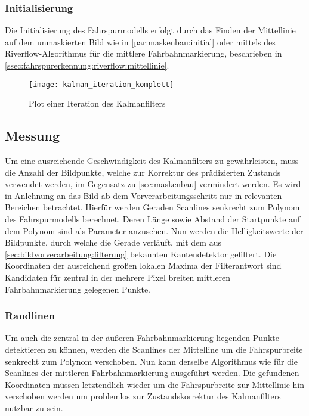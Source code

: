 \subsubsection{Initialisierung} 
\label{sssec:fahrspurerkennung:kalman:fahrspurmodell:initialisierung}
 Die Initialisierung des Fahrspurmodells erfolgt durch das Finden der Mittellinie auf dem unmaskierten Bild wie in \ref{par:maskenbau:initial} oder mittels des Riverflow-Algorithmus für die mittlere Fahrbahnmarkierung, beschrieben in \ref{ssec:fahrspurerkennung:riverflow:mittellinie}.
 
 \begin{figure}[htb]
 	\centering
 	\texttt{[image: kalman\_iteration\_komplett]}
 	\caption{Plot einer Iteration des Kalmanfilters}
 	\label{fig:kalman:iteration_komplett}
 \end{figure}
 
\subsection{Messung} \label{ssec:fahrspurerkennung:kalman:messung}
Um eine ausreichende Geschwindigkeit des Kalmanfilters zu gewährleisten, muss die Anzahl der Bildpunkte, welche zur Korrektur des prädizierten Zustands verwendet werden, im Gegensatz zu \ref{sec:maskenbau} vermindert werden. Es wird in Anlehnung an \autocite{risackRobustLaneRecognition} das Bild ab dem Vorverarbeitungsschritt nur in relevanten Bereichen betrachtet.
Hierfür werden Geraden \glqq Scanlines\grqq{} senkrecht zum Polynom des Fahrspurmodells berechnet. Deren Länge sowie Abstand der Startpunkte auf dem Polynom sind als Parameter anzusehen. Nun werden die Helligkeitswerte der Bildpunkte, durch welche die Gerade verläuft, mit dem aus \ref{sec:bildvorverarbeitung:filterung} bekannten Kantendetektor gefiltert. Die Koordinaten der ausreichend großen lokalen Maxima der Filterantwort sind Kandidaten für zentral in der mehrere Pixel breiten mittleren Fahrbahnmarkierung gelegenen Punkte.

\subsubsection{Randlinen}
Um auch die zentral in der äußeren Fahrbahnmarkierung liegenden Punkte detektieren zu können, werden die Scanlines der Mittelline um die Fahrspurbreite senkrecht zum Polynom verschoben. Nun kann derselbe Algorithmus wie für die Scanlines der mittleren Fahrbahnmarkierung ausgeführt werden. Die gefundenen Koordinaten müssen letztendlich wieder um die Fahrspurbreite zur Mittellinie hin verschoben werden um problemlos zur Zustandskorrektur des Kalmanfilters nutzbar zu sein.
 
